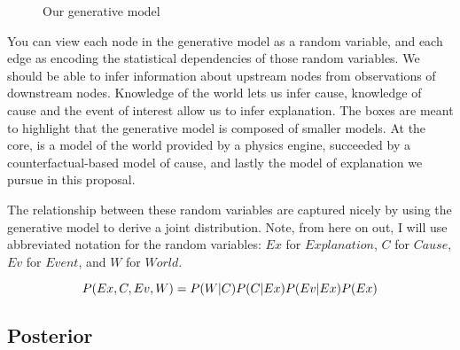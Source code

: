 \documentclass[11pt,a4paper]{article}
\begin{document}
\begin{figure}[ht]
	\centering
	
	\caption{Our generative model}
	\label{fig:gen_model}
\end{figure}

You can view each node in the generative model as a random variable, and each edge as encoding the statistical dependencies of those random variables. We should be able to infer information about upstream nodes from observations of downstream nodes. Knowledge of the world lets us infer cause, knowledge of cause and the event of interest allow us to infer explanation. The boxes are meant to highlight that the generative model is composed of smaller models. At the core, is a model of the world provided by a physics engine, succeeded by a counterfactual-based model of cause, and lastly the model of explanation we pursue in this proposal.

The relationship between these random variables are captured nicely by using the generative model to derive a joint distribution. Note, from here on out, I will use abbreviated notation for the random variables: $Ex$ for $Explanation$, $C$ for $Cause$, $Ev$ for $Event$, and $W$ for $World$.

\begin{equation}
P(Ex, C, Ev, W) = \\ P(W|C)P(C|Ex)P(Ev|Ex)P(Ex)
\end{equation}

\subsection{Posterior}
\end{document}
